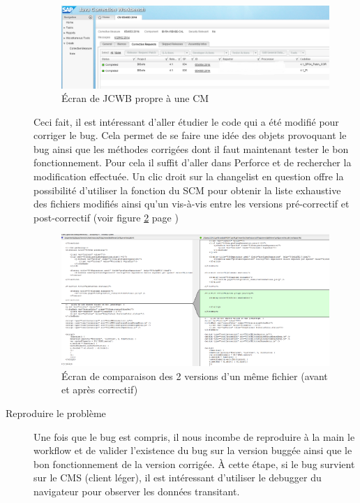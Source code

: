 \begin{description}
	\begin{figure}[!ht]
  \centering
      \includegraphics[width=\textwidth]{images/JCWB-CRs.png}
  \caption{\'{E}cran de JCWB propre \`{a} une CM}
	\label{figure:JCWB-CRs}
\end{figure}
Ceci fait, il est int\'{e}ressant d'aller \'{e}tudier le code qui a \'{e}t\'{e} modifi\'{e} pour corriger le bug. Cela permet de se faire une idée des objets provoquant le bug ainsi que les méthodes corrigées dont il faut maintenant tester le bon fonctionnement. Pour cela il suffit d'aller dans Perforce et de rechercher la modification effectuée. Un clic droit sur la changelist en question offre la possibilité d'utiliser la fonction  du SCM pour obtenir la liste exhaustive des fichiers modifi\'{e}s ainsi qu'un vis-\`{a}-vis entre les versions pr\'{e}-correctif et post-correctif (voir figure \ref{figure:diffAgainst} page \pageref{figure:diffAgainst})\\
	\begin{figure}[!ht]
  \centering
      \includegraphics[width=\textwidth]{images/diffAgainst.png}
  \caption{\'{E}cran de comparaison des 2 versions d'un m\^{e}me fichier (avant et apr\`{e}s correctif)}
	\label{figure:diffAgainst}
\end{figure}

	\item[Reproduire le probl\`{e}me] Une fois que le bug est compris, il nous incombe de reproduire \`{a} la main le workflow et de valider l'existence du bug sur la version bugg\'{e}e ainsi que le bon fonctionnement de la version corrig\'{e}e. \`{A} cette \'{e}tape, si le bug survient sur le CMS (client l\'{e}ger), il est int\'{e}ressant d'utiliser le debugger du navigateur pour observer les donn\'{e}es transitant.
	

\end{description}
